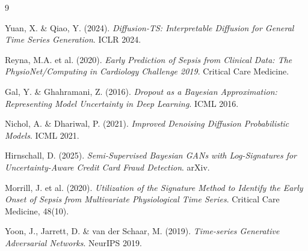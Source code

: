 \documentclass[11pt,a4paper]{article}
\begin{document}
\begin{thebibliography}{9}

Yuan, X. \& Qiao, Y. (2024).
\textit{Diffusion-TS: Interpretable Diffusion for General Time Series Generation}.
ICLR 2024.

Reyna, M.A. et al. (2020).
\textit{Early Prediction of Sepsis from Clinical Data: The PhysioNet/Computing in
Cardiology Challenge 2019}. Critical Care Medicine.

Gal, Y. \& Ghahramani, Z. (2016).
\textit{Dropout as a Bayesian Approximation: Representing Model Uncertainty in Deep Learning}.
ICML 2016.

Nichol, A. \& Dhariwal, P. (2021).
\textit{Improved Denoising Diffusion Probabilistic Models}. ICML 2021.

Hirnschall, D. (2025).
\textit{Semi-Supervised Bayesian GANs with Log-Signatures for Uncertainty-Aware
Credit Card Fraud Detection}. arXiv.

Morrill, J. et al. (2020).
\textit{Utilization of the Signature Method to Identify the Early Onset of Sepsis
from Multivariate Physiological Time Series}. Critical Care Medicine, 48(10).

Yoon, J., Jarrett, D. \& van der Schaar, M. (2019).
\textit{Time-series Generative Adversarial Networks}. NeurIPS 2019.

\end{thebibliography}
\end{document}
